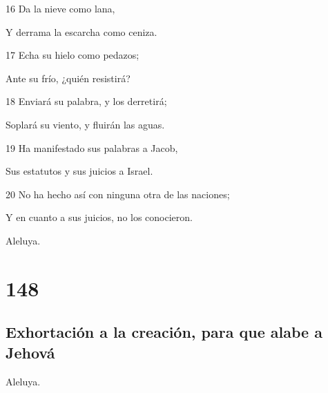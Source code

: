\par 16 Da la nieve como lana,
\par Y derrama la escarcha como ceniza.
\par 17 Echa su hielo como pedazos;
\par Ante su frío, ¿quién resistirá?
\par 18 Enviará su palabra, y los derretirá;
\par Soplará su viento, y fluirán las aguas.
\par 19 Ha manifestado sus palabras a Jacob,
\par Sus estatutos y sus juicios a Israel.
\par 20 No ha hecho así con ninguna otra de las naciones;
\par Y en cuanto a sus juicios, no los conocieron.
\par Aleluya.

\chapter{148}

\section*{Exhortación a la creación, para que alabe a Jehová}

\par Aleluya.

